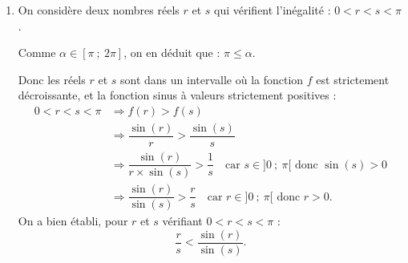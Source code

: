 \documentclass[10pt]{article}
\begin{document}
\begin{enumerate}
\begin{enumerate}
\begin{center}
\end{center}

\item On en déduit que la fonction $f$ est strictement décroissante sur l'intervalle $]0~;~\alpha]$ et strictement croissante sur $[\alpha~;~2\pi]$.

\item Pour tout réel $x$ non nul, le taux d'accroissement de la fonction sinus entre 0 et $x$ est :
\[
\dfrac{\sin(x)-\sin(0)}{x-0}=\dfrac{\sin(x)-0}{x}=\dfrac{\sin(x)}{x}=f(x).
\]
Comme la fonction sinus est dérivable en 0, ce taux d'accroissement admet donc une limite finie quand $x$ tend vers 0. Par définition du nombre dérivé, cette limite est le nombre dérivé de la fonction sinus en 0.

On a donc : $\displaystyle\lim_{x\to 0}f(x)=\sin'(0)=\cos(0)=1$.

$f$ tend vers 1 quand $x$ tend vers 0.
\end{enumerate}

\item On considère deux nombres réels $r$ et $s$ qui vérifient l'inégalité : $0<r<s<\pi$.

Comme $\alpha\in[\pi~;~2\pi]$, on en déduit que : $\pi\leq \alpha$.

Donc les réels $r$ et $s$ sont dans un intervalle où la fonction $f$ est strictement décroissante, et la fonction sinus à valeurs strictement positives :
\[
\begin{aligned}
0<r<s<\pi&\Longrightarrow f(r)>f(s)\\
&\Longrightarrow \dfrac{\sin(r)}{r}>\dfrac{\sin(s)}{s}\\
&\Longrightarrow \dfrac{\sin(r)}{r\times \sin(s)}>\dfrac1s \quad \text{car } s\in ]0~;~\pi[ \text{ donc } \sin(s)>0\\
&\Longrightarrow \dfrac{\sin(r)}{\sin(s)}>\dfrac rs \quad \text{car } r\in ]0~;~\pi[ \text{ donc } r>0.
\end{aligned}
\]
On a bien établi, pour $r$ et $s$ vérifiant $0<r<s<\pi$ :
\[
\dfrac rs<\dfrac{\sin(r)}{\sin(s)}.
\]
\end{enumerate}
\end{document}
